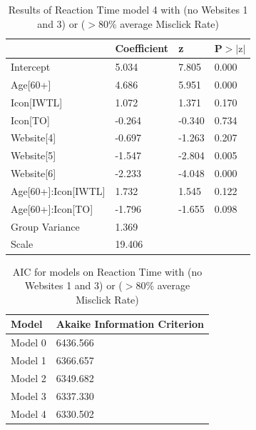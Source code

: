 \documentclass[12pt,twoside]{reedthesis}
\begin{document}
\begin{table}[h!]
        \centering
        \begin{tabular}{| p{5cm} | p{2.5cm} | p{2.5cm} | p{2.5cm} |}
            \hline
            & Coefficient & z & P$>|\text{z}|$\\
            \hline
            Intercept & 5.034 & 7.805 & 0.000\\
            \hline
            Age[60+] & 4.686 & 5.951 & 0.000\\
            \hline
            Icon[IWTL] & 1.072 & 1.371 & 0.170\\
            \hline
            Icon[TO] & -0.264 & -0.340 & 0.734\\
            \hline
            Website[4] & -0.697 & -1.263 & 0.207\\
            \hline
            Website[5] & -1.547 & -2.804 & 0.005\\
            \hline
            Website[6] & -2.233 & -4.048 & 0.000\\
            \hline
            Age[60+]:Icon[IWTL] & 1.732 & 1.545 & 0.122\\
            \hline
            Age[60+]:Icon[TO] & -1.796 & -1.655 & 0.098\\
            Group Variance & 1.369 &&\\
            \hline
            Scale & 19.406 &&\\
            \hline
        \end{tabular}
        \caption{Results of Reaction Time model 4 with (no Websites 1 and 3) or ($>80$\% average Misclick Rate)}
    \end{table}


\begin{table}[h!]
        \centering
        \begin{tabular}{| p{3.5cm} | p{7.5cm} |}
            \hline
            Model & Akaike Information Criterion\\
            \hline
            Model 0 & 6436.566\\
            \hline
            Model 1 & 6366.657\\
            \hline
            Model 2 & 6349.682\\
            \hline
            Model 3 & 6337.330\\
            \hline
            Model 4 & 6330.502\\
            \hline
        \end{tabular}
        \caption{AIC for models on Reaction Time with (no Websites 1 and 3) or ($>80$\% average Misclick Rate)}
    \end{table}
\end{document}
